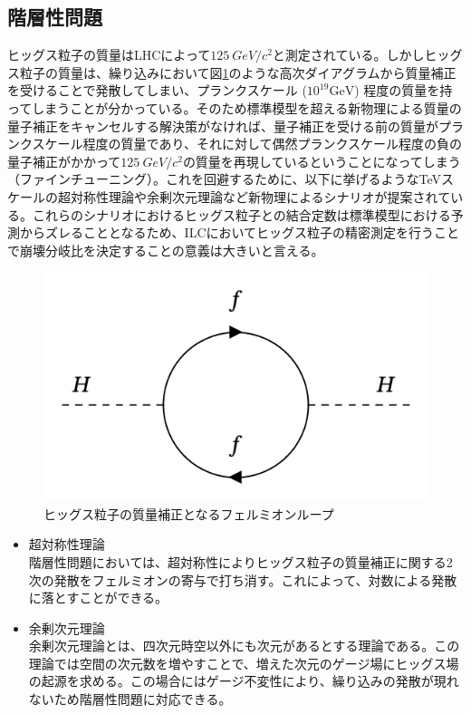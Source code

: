 \subsection{階層性問題}
ヒッグス粒子の質量はLHCによって$\SI{125}{GeV/c^2}$と測定されている。しかしヒッグス粒子の質量は、繰り込みにおいて図\ref{hierarchy}のような高次ダイアグラムから質量補正を受けることで発散してしまい、プランクスケール ($10^{19} \mathrm{GeV}$) 程度の質量を持ってしまうことが分かっている。そのため標準模型を超える新物理による質量の量子補正をキャンセルする解決策がなければ、量子補正を受ける前の質量がプランクスケール程度の質量であり、それに対して偶然プランクスケール程度の負の量子補正がかかって$\SI{125}{GeV/c^2}$の質量を再現しているということになってしまう（ファインチューニング）。これを回避するために、以下に挙げるようなTeVスケールの超対称性理論や余剰次元理論など新物理によるシナリオが提案されている。これらのシナリオにおけるヒッグス粒子との結合定数は標準模型における予測からズレることとなるため、ILCにおいてヒッグス粒子の精密測定を行うことで崩壊分岐比を決定することの意義は大きいと言える。
\begin{figure}[h]
	\begin{center}
 \includegraphics[keepaspectratio, scale=0.3]
 	{Figure/Introduction/feynman.png}
 		\caption{ヒッグス粒子の質量補正となるフェルミオンループ}
 		\label{hierarchy}
	\end{center}
\end{figure}
\begin{itemize}
\item{超対称性理論}\\
階層性問題においては、超対称性によりヒッグス粒子の質量補正に関する2次の発散をフェルミオンの寄与で打ち消す。これによって、対数による発散に落とすことができる。
\item{余剰次元理論}\\
余剰次元理論とは、四次元時空以外にも次元があるとする理論である。この理論では空間の次元数を増やすことで、増えた次元のゲージ場にヒッグス場の起源を求める。この場合にはゲージ不変性により、繰り込みの発散が現れないため階層性問題に対応できる。
\end{itemize}
